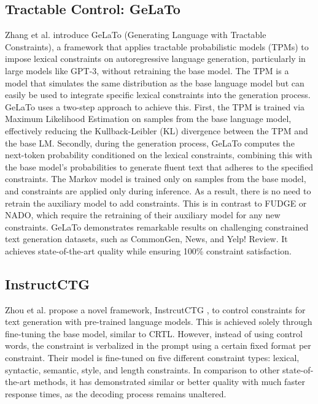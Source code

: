 \subsection{Tractable Control: GeLaTo}
Zhang et al. \cite{zhang_tractable_2023} introduce GeLaTo (Generating Language with Tractable Constraints), a framework that applies tractable probabilistic models (TPMs) to impose lexical constraints on autoregressive language generation, particularly in large models like GPT-3, without retraining the base model. The TPM is a model that simulates the same distribution as the base language model but can easily be used to integrate specific lexical constraints into the generation process. GeLaTo uses a two-step approach to achieve this. First, the TPM is trained via Maximum Likelihood Estimation on samples from the base language model, effectively reducing the Kullback-Leibler (KL) divergence between the TPM and the base LM. Secondly, during the generation process, GeLaTo computes the next-token probability conditioned on the lexical constraints, combining this with the base model's probabilities to generate fluent text that adheres to the specified constraints. The Markov model is trained only on samples from the base model, and constraints are applied only during inference. As a result, there is no need to retrain the auxiliary model to add constraints. This is in contrast to FUDGE or NADO, which require the retraining of their auxiliary model for any new constraints.  GeLaTo demonstrates remarkable results on challenging constrained text generation datasets, such as CommonGen, News, and Yelp! Review. It achieves state-of-the-art quality while ensuring 100\% constraint satisfaction. 

\subsection{InstructCTG}
Zhou et al. propose a novel framework, InstrcutCTG \cite{zhou_controlled_2023}, to control constraints for text generation with pre-trained language models. This is achieved solely through fine-tuning the base model, similar to CRTL. However, instead of using control words, the constraint is verbalized in the prompt using a certain fixed format per constraint. Their model is fine-tuned on five different constraint types: lexical, syntactic, semantic, style, and length constraints. In comparison to other state-of-the-art methods, it has demonstrated similar or better quality with much faster response times, as the decoding process remains unaltered.

